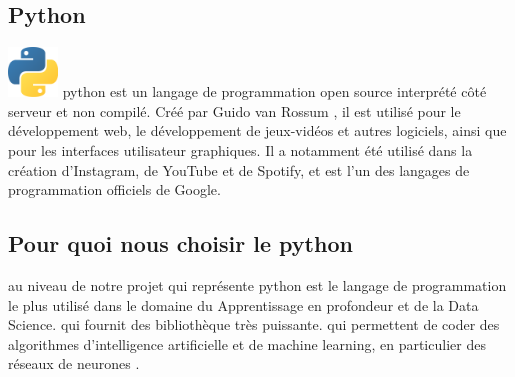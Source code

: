 \documentclass[12pt]{report}
\begin{document}
\subsection{Python}
\begin{multicols}
\includegraphics[width=50]{python.png}
python est un langage de programmation open source interprété côté serveur et non compilé. Créé par Guido van Rossum \cite{ref24}, il est utilisé pour le développement web, le développement de jeux-vidéos et autres logiciels, ainsi que pour les interfaces utilisateur graphiques. Il a notamment été utilisé dans la création d'Instagram, de YouTube et de Spotify, et est l'un des langages de programmation officiels de Google.
\end{multicols}


\subsection{Pour quoi nous choisir le python}
au niveau de notre projet qui représente python est le langage de programmation le plus utilisé dans le domaine du Apprentissage en profondeur et de la Data Science. qui fournit des bibliothèque très puissante. qui permettent de coder des algorithmes d'intelligence artificielle et de machine learning, en particulier des réseaux de neurones .
\end{document}
